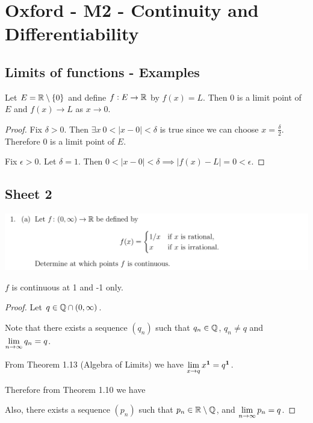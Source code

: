 \newpage
\section{Oxford - M2 - Continuity and Differentiability}

\subsection{Limits of functions - Examples}

\begin{example}
  Let $E = \R\setminus \{0\}$ and define $f:E \to \R$ by $f(x) = L$. Then 0 is a limit point of
  $E$ and $f(x) \to L$ as $x \to 0$.
\end{example}

\begin{proof}
  Fix $\delta > 0$. Then $\exists x ~ 0 < |x - 0| < \delta$ is true since we can choose
  $x = \frac{\delta}{2}$. Therefore 0 is a limit point of $E$.

  Fix $\epsilon > 0$. Let $\delta = 1$. Then
  $0 < |x - 0| < \delta \implies |f(x) - L| = 0 < \epsilon$.
\end{proof}

\newpage
\subsection{Sheet 2}

\begin{mdframed}
  \includegraphics[width=400pt]{img/oxford-prelims-M2-analysis-II-sheet-2-1a.png}
\end{mdframed}

\begin{theorem*}
  $f$ is continuous at 1 and -1 only.
\end{theorem*}

\begin{proof} Let $q \in \Q \cap (0, \infty)$.

  Note that there exists a sequence $(q_n)$ such that $q_n \in \Q$, $q_n \neq q$ and
  $\LimEq{q_n}{q}{n}{\infty}$.

  From Theorem 1.13 (Algebra of Limits) we have $\Lim{x^\1}{x}{q} = q^\1$.

  Therefore from Theorem 1.10 we have


  Also, there exists a sequence $(p_n)$ such that $p_n \in \R\setminus\Q$, and
  $\LimEq{p_n}{q}{n}{\infty}$.


\end{proof}

